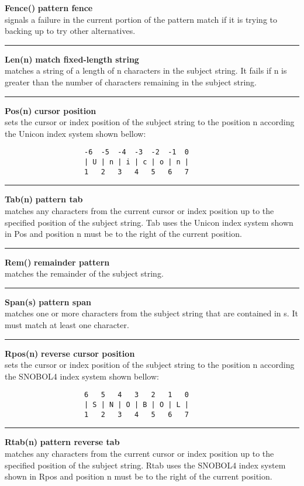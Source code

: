 \documentclass{article}
\begin{document}
\noindent\textbf{Fence()} \hfill\textbf{pattern fence}\\
signals a failure in the current portion of the pattern match if it is trying to backing up to try other alternatives.\\
\noindent\rule{12cm}{0.1pt}

\noindent\textbf{Len(n)} \hfill\textbf{match fixed-length string}\\
matches a string of a length of n characters in the subject string.  It fails if n is greater than the number of characters remaining in the subject string.\\
\noindent\rule{12cm}{0.1pt}

\noindent\textbf{Pos(n)} \hfill\textbf{cursor position}\\
sets the cursor or index position of the subject string to the position n according the Unicon index system shown bellow:
\begin{verbatim}
                   -6  -5  -4  -3  -2  -1  0
                   | U | n | i | c | o | n |
                   1   2   3   4   5   6   7
\end{verbatim}
\noindent\rule{12cm}{0.1pt}

\noindent\textbf{Tab(n)} \hfill\textbf{pattern tab}\\
matches any characters from the current cursor or index position up to the specified position of the subject string. Tab uses the Unicon index system shown in Pos and position n must be to the right of the current position.\\
\noindent\rule{12cm}{0.1pt}

\noindent\textbf{Rem()} \hfill\textbf{remainder pattern}\\
matches the remainder of the subject string.\\
\noindent\rule{12cm}{0.1pt}

\noindent\textbf{Span(s)} \hfill\textbf{pattern span}\\
matches one or more characters from the subject string that are contained in s.  It must match at least one character.\\
\noindent\rule{12cm}{0.1pt}

\noindent\textbf{Rpos(n)} \hfill\textbf{reverse cursor position}\\
sets the cursor or index position of the subject string to the position n according the SNOBOL4 index system shown bellow:
\begin{verbatim}
                   6   5   4   3   2   1   0
                   | S | N | O | B | O | L |
                   1   2   3   4   5   6   7
\end{verbatim}
\noindent\rule{12cm}{0.1pt}

\noindent\textbf{Rtab(n)} \hfill\textbf{pattern reverse tab}\\
matches any characters from the current cursor or index position up to the specified position of the subject string. Rtab uses the SNOBOL4 index system shown in Rpos and position n must be to the right of the current position.\\


\newpage


\end{document}
